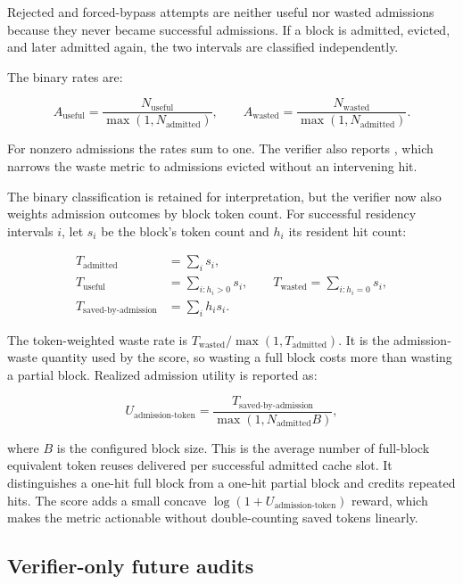 \documentclass[11pt]{article}
\newcommand{\metric}[1]{\texttt{\detokenize{#1}}}
\begin{document}
Rejected and forced-bypass attempts are neither useful nor wasted admissions because
they never became successful admissions.  If a block is admitted, evicted, and later
admitted again, the two intervals are classified independently.

The binary rates are:

\begin{equation}
  A_{\text{useful}} =
  \frac{N_{\text{useful}}}{\max(1,N_{\text{admitted}})},\qquad
  A_{\text{wasted}} =
  \frac{N_{\text{wasted}}}{\max(1,N_{\text{admitted}})}.
\end{equation}

For nonzero admissions the rates sum to one.  The verifier also reports
\metric{evicted_without_hit_rate}, which narrows the waste metric to admissions evicted
without an intervening hit.

The binary classification is retained for interpretation, but the verifier now also
weights admission outcomes by block token count.  For successful residency intervals
\(i\), let \(s_i\) be the block's token count and \(h_i\) its resident hit count:

\begin{align}
  T_{\text{admitted}} &= \sum_i s_i,\\
  T_{\text{useful}} &= \sum_{i:h_i>0}s_i,\qquad
  T_{\text{wasted}} = \sum_{i:h_i=0}s_i,\\
  T_{\text{saved-by-admission}} &= \sum_i h_i s_i.
\end{align}

The token-weighted waste rate is
\(T_{\text{wasted}}/\max(1,T_{\text{admitted}})\).  It is the admission-waste
quantity used by the score, so wasting a full block costs more than wasting a partial
block.  Realized admission utility is reported as:

\begin{equation}
  U_{\text{admission-token}} =
  \frac{T_{\text{saved-by-admission}}}
       {\max(1,N_{\text{admitted}}B)},
\end{equation}

where \(B\) is the configured block size.  This is the average number of full-block
equivalent token reuses delivered per successful admitted cache slot.  It distinguishes
a one-hit full block from a one-hit partial block and credits repeated hits.  The score
adds a small concave \(\log(1+U_{\text{admission-token}})\) reward, which makes the
metric actionable without double-counting saved tokens linearly.

\subsection{Verifier-only future audits}
\end{document}
